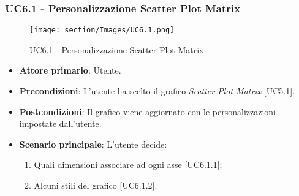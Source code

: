 \subsubsection{UC6.1 - Personalizzazione Scatter Plot Matrix}
\begin{figure}[h]
\texttt{[image: section/Images/UC6.1.png]}
\centering
\caption{UC6.1 - Personalizzazione Scatter Plot Matrix}
\end{figure}
\begin{itemize}
	\item \textbf{Attore primario}: Utente.
	
	\item \textbf{Precondizioni}: L'utente ha scelto il grafico \textit{Scatter Plot Matrix} [UC5.1].
	
	\item \textbf{Postcondizioni}: Il grafico viene aggiornato con le personalizzazioni impostate dall'utente.
	
	\item \textbf{Scenario principale}: L'utente decide:

\begin{enumerate}
\item Quali dimensioni associare ad ogni asse [UC6.1.1];
\item Alcuni stili del grafico [UC6.1.2].
\end{enumerate}	
	
		

\end{itemize}


